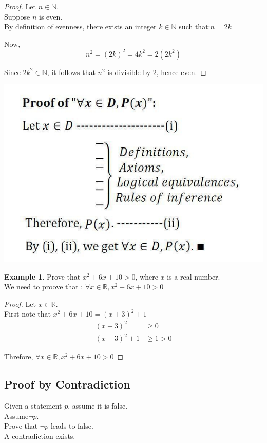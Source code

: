 \documentclass[
]{book}
\theoremstyle{definition}
\theoremstyle{definition}
\newtheorem{example}{Example}[chapter]
\theoremstyle{definition}
\theoremstyle{definition}
\theoremstyle{remark}
\begin{document}
\begin{proof}
Let \(n \in \mathbb{N}\).\\
Suppose \(n\) is even.\\
By definition of evenness, there exists an integer \(k \in \mathbb{N}\) such that:\(n = 2k\)

Now,
\[
n^2 = (2k)^2 = 4k^2 = 2(2k^2)
\]

Since \(2k^2 \in \mathbb{N}\), it follows that \(n^2\) is divisible by 2, hence even.
\end{proof}

\includegraphics[width=0.6\linewidth,height=\textheight,keepaspectratio]{fig/fig5.png}

\begin{example}
\protect\hypertarget{exm:unnamed-chunk-78}{}\label{exm:unnamed-chunk-78}Prove that \(x^2 + 6x + 10 > 0\), where \(x\) is a real number.\\
We need to proove that : \(\forall x \in \mathbb{R},x^2 + 6x + 10 > 0\)
\end{example}

\begin{proof}
Let \(x\in \mathbb{R}\).\\
First note that \(x^2 + 6x + 10 = (x + 3)^2 + 1\)
\[
\begin{align}
(x+3)^2 & \geq 0\\
(x+3)^2+1 & \geq 1>0
\end{align}
\]

Threfore, \(\forall x \in \mathbb{R},x^2 + 6x + 10 > 0\)
\end{proof}

\subsection{Proof by Contradiction}\label{proof-by-contradiction}

Given a statement \(p\), assume it is false.\\
Assume\(\neg p\).\\
Prove that \(\neg p\) leads to false.\\
A contradiction exists.\\
\end{document}

